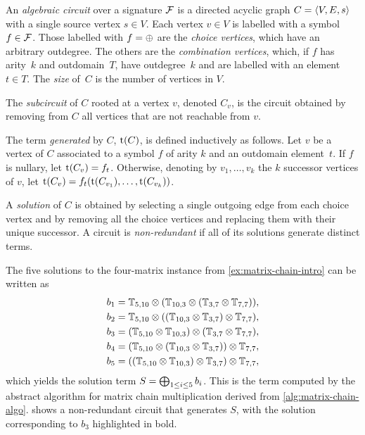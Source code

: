 \begin{definition}
    \label{def:adp:alg-circuits}%
    An \emph{algebraic circuit} over a signature \(\mathcal{F}\) is a directed acyclic graph \(C = \left\langle V, E, s\right\rangle\) with a single source vertex \(s \in V\).
    Each vertex \(v \in V\) is labelled with a symbol \(f \in \mathcal{F}\).
    Those labelled with \(f = \mathbin{\oplus}\) are the \emph{choice vertices},
    which have an arbitrary outdegree.
    The others are the \emph{combination vertices}, which, if \(f\) has arity~\(k\) and outdomain~\(T\), have outdegree~\(k\) and are labelled with an element \(t \in T\).
    The \emph{size} of~\(C\) is the number of vertices in \(V\).

    The \emph{subcircuit} of \(C\) rooted at a vertex \(v\), denoted \(C_v\), is the circuit obtained by removing from \(C\) all vertices that are not reachable from \(v\).

    The term \emph{generated} by \(C\), \(\operatorname{t}(C)\), is defined inductively as follows.
    Let \(v\) be a vertex of \(C\) associated to a symbol \(f\) of arity \(k\) and an outdomain element~\(t\).
    If \(f\) is nullary, let \(\operatorname{t}(C_v) = f_t\).
    Otherwise, denoting by \(v_1, \ldots, v_k\) the \(k\) successor vertices of \(v\), let \(\operatorname{t}(C_v) = f_t(\operatorname{t}(C_{v_1}), \ldots, \operatorname{t}(C_{v_k}))\).

    A \emph{solution} of \(C\) is obtained by selecting a single outgoing edge from each choice vertex and by removing all the choice vertices and replacing them with their unique successor.
    A circuit is \emph{non-redundant} if all of its solutions generate distinct terms.
\end{definition}

\begin{example}\label{ex:matrix-chain-sig}
    The five solutions to the four-matrix instance from \cref{ex:matrix-chain-intro} can be written as \begin{align*}
        b_1 &= \mathbb{T}_{5,10} \mathbin{\otimes} (\mathbb{T}_{10,3} \mathbin{\otimes} (\mathbb{T}_{3,7} \mathbin{\otimes} \mathbb{T}_{7,7})), \\
        b_2 &= \mathbb{T}_{5,10} \mathbin{\otimes} ((\mathbb{T}_{10,3} \mathbin{\otimes} \mathbb{T}_{3,7}) \mathbin{\otimes} \mathbb{T}_{7,7}), \\
        b_3 &= (\mathbb{T}_{5,10} \mathbin{\otimes} \mathbb{T}_{10,3}) \mathbin{\otimes} (\mathbb{T}_{3,7} \mathbin{\otimes} \mathbb{T}_{7,7}), \\
        b_4 &= (\mathbb{T}_{5,10} \mathbin{\otimes} (\mathbb{T}_{10,3} \mathbin{\otimes} \mathbb{T}_{3,7})) \mathbin{\otimes} \mathbb{T}_{7,7}, \\
        b_5 &= ((\mathbb{T}_{5,10} \mathbin{\otimes} \mathbb{T}_{10,3}) \mathbin{\otimes} \mathbb{T}_{3,7}) \mathbin{\otimes} \mathbb{T}_{7,7},
    \end{align*}
    which yields the solution term \(S = \bigoplus_{1\le i\le 5}b_i\).
    This is the term computed by the abstract algorithm for matrix chain multiplication derived from \cref{alg:matrix-chain-algo}.
     shows a non-redundant circuit that generates \(S\), with the solution corresponding to \(b_3\) highlighted in bold.
\end{example}

